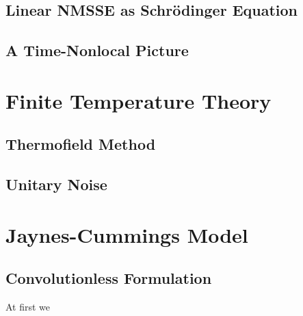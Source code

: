 \subsection{Linear NMSSE as Schrödinger Equation}
\label{sub:nmqsd.interpretation.unitary_view}

\subsection{A Time-Nonlocal Picture}
\label{sub:nmqsd.interpretation.time_osci}


\section{Finite Temperature Theory}
\label{sec:nmqsd.temperature}

\subsection{Thermofield Method}
\label{sub:nmqsd.temperature.thermofield}

\subsection{Unitary Noise}
\label{sub:nmqsd.temperature.unitary}


\section{Jaynes-Cummings Model}
\label{sec:nmqsd.jaynes_cummings}


\subsection{Convolutionless Formulation}
\label{sub:nmqsd.jaynes_cummings.convolutionless}

At first we

